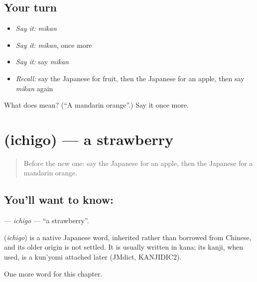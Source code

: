 \subsection*{Your turn}
\begin{itemize}
\raggedright
  \item \emph{Say it:} \emph{mikan}
  \item \emph{Say it:} \emph{mikan}, once more
  \item \emph{Say it:} say \emph{mikan}
  \item \emph{Recall:} say the Japanese for fruit, then the Japanese for an apple, then say \emph{mikan} again
\end{itemize}

\begin{tcolorbox}[breakable,colback=teal!4,colframe=teal!35!black,title={Before you move on}]
What does  mean? (\textquotedblleft{}A mandarin orange\textquotedblright{}.) Say it once more.
\end{tcolorbox}
\section[\texorpdfstring{\ja{いちご} (ichigo)}{いちご (ichigo)}]{ (ichigo) — a strawberry}

\label{lesson:JA-C33-ichigo}



\begin{quote}
Before the new one: say the Japanese for an apple, then the Japanese for a mandarin orange.
\end{quote}

\subsection*{You'll want to know: }
\textbf{} — \emph{ichigo} — \textquotedblleft{}a strawberry\textquotedblright{}.

\begin{cousinweb}
\textbf{} (\emph{ichigo}) is a native Japanese word, inherited rather than borrowed from Chinese, and its older origin is not settled. It is usually written in kana; its kanji, when used, is a kun'yomi attached later (JMdict, KANJIDIC2).
\end{cousinweb}

\begin{grammarlens}[title={What you've built}]
One more word for this chapter.
\end{grammarlens}

